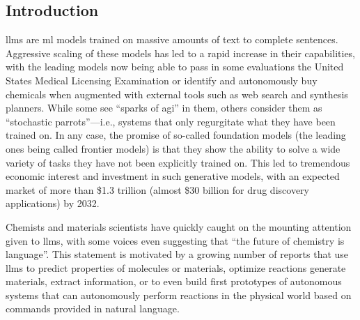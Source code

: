 \documentclass[11pt, oneside]{article}
\begin{document}
\clearpage
\begin{refsection}
\section{Introduction}
\Glspl{llm} are \gls{ml} models trained on massive amounts of text to complete sentences. 
Aggressive scaling of these models has led to a rapid increase in their capabilities,\autocite{brown2020language,zhong2024benchmarking} with the leading models now being able to pass in some evaluations the United States Medical Licensing Examination\cite{kung2023performance} or identify and autonomously buy chemicals when augmented with external tools such as web search and synthesis planners.\autocite{openai2024gpt4}
While some see \enquote{sparks of \gls{agi}} in them,\autocite{bubeck2023sparks} others consider them as \enquote{stochastic parrots}---i.e., systems that only regurgitate what they have been trained on.\autocite{bender2021dangers}
In any case, the promise of so-called foundation models (the leading ones being called frontier models) is that they show the ability to solve a wide variety of tasks they have not been explicitly trained on.\autocite{bommasani2021opportunities, anderljung2023frontier}
This led to tremendous economic interest and investment in such generative models, with an expected market of more than \$1.3 trillion (almost \$30 billion for drug discovery applications) by 2032.\autocite{bloomberg}

Chemists and materials scientists have quickly caught on the mounting attention given to \glspl{llm}, with some voices even suggesting that \enquote{the future of chemistry is language}.\autocite{White_2023}
This statement is motivated by a growing number of reports that use \glspl{llm} to predict properties of molecules or materials,\autocite{jablonka202314, jablonka2024leveraging, xie2024fine, liao2024words, zhang2024chemllm, zhong2024benchmarking}  optimize reactions\autocite{ramos2023bayesian, kristiadi2024sober}  generate materials,\autocite{rubungo2023llm, flam2023language, gruver2024fine} extract information,\autocite{Patiny_2023, Dagdelen_2024, Zheng_2024, lála2023paperqa, caufield2023structured} or to even build first prototypes of autonomous systems that can autonomously perform reactions in the physical world based on commands provided in natural language.\autocite{bran2023chemcrow, Boiko_2023, darvish2024organa}


\end{refsection}
\end{document}
